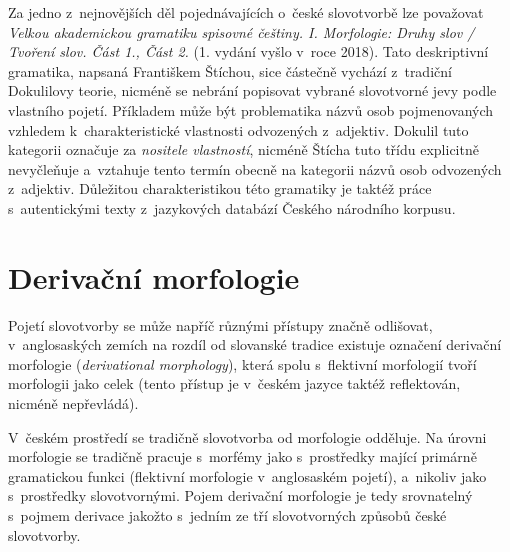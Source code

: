 Za jedno z~nejnovějších děl pojednávajících o~české slovotvorbě lze
považovat \emph{Velkou akademickou gramatiku spisovné češtiny. I.
Morfologie: Druhy slov / Tvoření slov. Část 1., Část 2.} (1. vydání
vyšlo v~roce 2018). Tato deskriptivní gramatika, napsaná Františkem
Štíchou, sice částečně vychází z~tradiční Dokulilovy teorie, nicméně se
nebrání popisovat vybrané slovotvorné jevy podle vlastního pojetí.
Příkladem může být problematika názvů osob pojmenovaných vzhledem
k~charakteristické vlastnosti odvozených z~adjektiv. Dokulil tuto
kategorii označuje za \emph{nositele vlastností}, nicméně Štícha tuto
třídu explicitně nevyčleňuje a~vztahuje tento termín obecně na kategorii
názvů osob odvozených z~adjektiv. Důležitou charakteristikou této
gramatiky je taktéž práce s~autentickými texty z~jazykových databází
Českého národního korpusu.~\parencite{sticha18}

\hypertarget{derivaux10dnuxed-morfologie}{%
\section{Derivační morfologie}\label{derivaux10dnuxed-morfologie}}

Pojetí slovotvorby se může napříč různými přístupy značně odlišovat,
v~anglosaských zemích na rozdíl od slovanské tradice existuje označení
derivační morfologie (\emph{derivational morphology}), která spolu
s~flektivní morfologií tvoří morfologii jako celek (tento přístup je
v~českém jazyce taktéž reflektován, nicméně nepřevládá).
\parencite{lieber14}

V~českém prostředí se tradičně slovotvorba od morfologie odděluje. Na
úrovni morfologie se tradičně pracuje s~morfémy jako s~prostředky mající
primárně gramatickou funkci (flektivní morfologie v~anglosaském pojetí),
a~nikoliv jako s~prostředky slovotvornými. Pojem derivační morfologie je
tedy srovnatelný s~pojmem derivace jakožto s~jedním ze tří slovotvorných
způsobů české slovotvorby.
